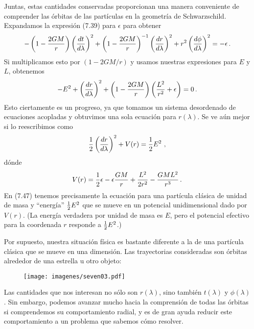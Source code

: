 \documentclass[11pt,b5paper,openany,twoside]{book}
\begin{document}
Juntas, estas cantidades conservadas proporcionan una manera conveniente de comprender las órbitas de las partículas en la geometría de Schwarzschild.
Expandamos la expresión (7.39) para $\epsilon$ para obtener
\begin{equation}
-\left(1-{{2GM}\over r}\right)\left({{dt}\over{d\lambda}}\right)^2 +
\left(1-{{2GM}\over r}\right)^{-1}\left({{dr}\over{d\lambda}}\right)^2
+r^2\left({{d\phi}\over{d\lambda}}\right)^2 = -\epsilon\,.\label{7.45}
\end{equation}
Si multiplicamos esto por $(1-2GM/r)$ y usamos nuestras expresiones para $E$ y $L$, obtenemos
\begin{equation}
-E^2+\left({{dr}\over{d\lambda}}\right)^2+\left(1-{{2GM}\over r}\right)
\left({{L^2}\over{r^2}} +\epsilon\right) =0\,.\label{7.46}
\end{equation}
Esto ciertamente es un progreso, ya que tomamos un sistema desordenado de ecuaciones acopladas y obtuvimos una sola ecuación para $r(\lambda)$.
Se ve aún mejor si lo reescribimos como
\begin{equation}
{1\over 2}\left({{dr}\over{d\lambda}}\right)^2+ V(r) =
{1\over 2}E^2\ ,\label{7.47}
\end{equation}
dónde
\begin{equation}
V(r) = {1\over 2}\epsilon - \epsilon{{GM}\over r} +
{{L^2}\over{2r^2}} - {{GML^2}\over {r^3}}\,.\label{7.48}
\end{equation}
En (7.47) tenemos precisamente la ecuación para una partícula clásica de unidad de masa y ``energía'' ${1\over 2}E^2$ que se mueve en un potencial unidimensional dado por $V(r)$.
(La energía verdadera por unidad de masa es $E$, pero el potencial efectivo para la coordenada $r$ responde a ${1\over 2}E^2$.)

Por supuesto, nuestra situación física es bastante diferente a la de una partícula clásica que se mueve en una dimensión.
Las trayectorias consideradas son órbitas alrededor de una estrella u otro objeto:

\begin{figure}[h]
\centering
\texttt{[image: imagenes/seven03.pdf]}
\end{figure}

\noindent
Las cantidades que nos interesan no sólo son $r(\lambda)$, sino también $t(\lambda)$ y $\phi(\lambda)$.
Sin embargo, podemos avanzar mucho hacia la comprensión de todas las órbitas si comprendemos su comportamiento radial, y es de gran ayuda reducir este comportamiento a un problema que sabemos cómo resolver.
\end{document}
